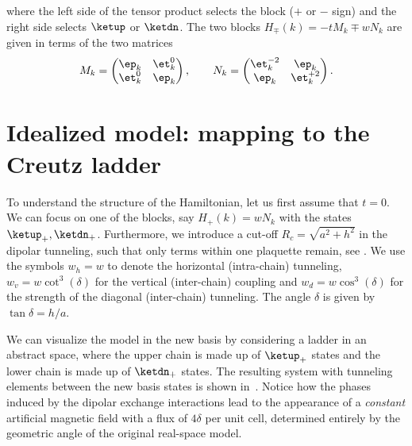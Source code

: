 where the left side of the tensor product selects the block ($+$ or $-$ sign) and the right side selects $\ketup$ or $\ketdn$. The two blocks $H_\mp(k) = -t M_k \mp w N_k$ are given in terms of the two matrices
\begin{align}
    M_k = \begin{pmatrix}
        \ep_k & \et_k^0 \\
        \et_k^0 & \ep_k
    \end{pmatrix},\qquad
    N_k = \begin{pmatrix}
    \et_k^{-2} & \ep_k \\
    \ep_k & \et_k^{+2}
    \end{pmatrix}.
\end{align}

\section{Idealized model: mapping to the Creutz ladder}


To understand the structure of the Hamiltonian, let us first assume that $t=0$.
We can focus on one of the blocks, say $H_+(k) = w N_k$ with the states $\ketup_+, \ketdn_+$.
Furthermore, we introduce a cut-off $R_c = \sqrt{a^2+h^2}$ in the dipolar tunneling, such that only terms within one plaquette remain, see .
We use the symbols $w_h = w$ to denote the horizontal (intra-chain) tunneling, $w_v = w \cot^3(\delta)$ for the vertical (inter-chain) coupling and $w_d = w \cos^3(\delta)$ for the strength of the diagonal (inter-chain) tunneling.
The angle $\delta$ is given by $\tan \delta = h/a$.

We can visualize the model in the new basis by considering a ladder in an abstract space, where the upper chain is made up of $\ketup_+$ states and the lower chain is made up of $\ketdn_+$ states.
The resulting system with tunneling elements between the new basis states is shown in~.
Notice how the phases induced by the dipolar exchange interactions lead to the appearance of a \emph{constant} artificial magnetic field with a flux of $4\delta$ per unit cell, determined entirely by the geometric angle of the original real-space model.

